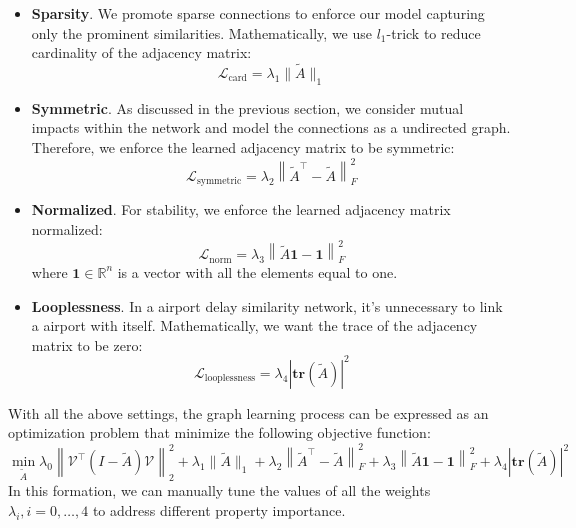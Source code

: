 \begin{itemize}
    \item \textbf{Sparsity}. We promote sparse connections to enforce our model capturing only the prominent similarities. Mathematically, we use $l_1$-trick to reduce cardinality of the adjacency matrix:
    \begin{equation}
        \mathcal{L}_{\text{card}}=\lambda_1\|\tilde{A}\|_1
    \end{equation}
    \item \textbf{Symmetric}. As discussed in the previous section, we consider mutual impacts within the network and model the connections as a undirected graph. Therefore, we enforce the learned adjacency matrix to be symmetric:
    \begin{equation}
        \mathcal{L}_{\text{symmetric}}=\lambda_2\left\|\tilde{A}^\intercal-\tilde{A}\right\|_F^2
    \end{equation}
    \item \textbf{Normalized}. For stability, we enforce the learned adjacency matrix normalized:
    \begin{equation}
        \mathcal{L}_{\text{norm}}=\lambda_3\left\|\tilde{A}\textbf{1}-\textbf{1}\right\|_F^2
    \end{equation}
    where $\textbf{1}\in\mathbb{R}^n$ is a vector with all the elements equal to one.
    \item \textbf{Looplessness}. In a airport delay similarity network, it's unnecessary to link a airport with itself. Mathematically, we want the trace of the adjacency matrix to be zero:
    \begin{equation}
        \mathcal{L}_{\text{looplessness}}=\lambda_4\left|\mathbf{tr}(\tilde{A})\right|^2
    \end{equation}
\end{itemize}
With all the above settings, the graph learning process can be expressed as an optimization problem that minimize the following objective function:
\begin{equation}
    \min_{\tilde{A}} \lambda_0\left\|\mathcal{V}^\intercal\left(I-\tilde{A}\right)\mathcal{V}\right\|_2^2+\lambda_1\|\tilde{A}\|_1+\lambda_2\left\|\tilde{A}^\intercal-\tilde{A}\right\|_F^2+\lambda_3\left\|\tilde{A}\textbf{1}-\textbf{1}\right\|_F^2+\lambda_4\left|\mathbf{tr}(\tilde{A})\right|^2
\end{equation}
In this formation, we can manually tune the values of all the weights $\lambda_i,i=0,\ldots,4$ to address different property importance.

